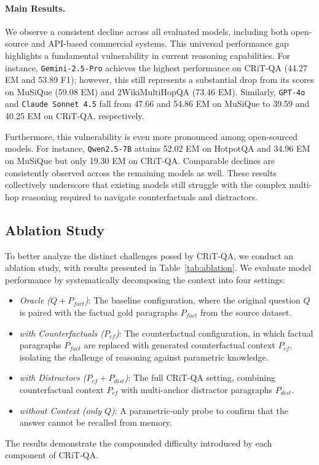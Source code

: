\documentclass[10pt, a4paper]{article}
\begin{document}
\paragraph{Main Results.} We observe a consistent decline across all evaluated models, including both open-source and API-based commercial systems. This universal performance gap highlights a fundamental vulnerability in current reasoning capabilities. For instance, \texttt{Gemini-2.5-Pro} achieves the highest performance on CRiT-QA (44.27 EM and 53.89 F1); however, this still represents a substantial drop from its scores on MuSiQue (59.08 EM) and 2WikiMultiHopQA (73.46 EM). Similarly, \texttt{GPT-4o} and \texttt{Claude Sonnet 4.5} fall from 47.66 and 54.86 EM on MuSiQue to 39.59 and 40.25 EM on CRiT-QA, respectively. 

Furthermore, this vulnerability is even more pronounced among open-sourced models. For instance, \texttt{Qwen2.5-7B} attains 52.02 EM on HotpotQA and 34.96 EM on MuSiQue but only 19.30 EM on CRiT-QA. Comparable declines are consistently observed across the remaining models as well. These results collectively underscore that existing models still struggle with the complex multi-hop reasoning required to navigate counterfactuals and distractors.


\subsection{Ablation Study}
To better analyze the distinct challenges posed by CRiT-QA, we conduct an ablation study, with results presented in Table~\ref{tab:ablation}. We evaluate model performance by systematically decomposing the context into four settings:
\begin{itemize}
    \item \textit{Oracle ($Q + P_{fact}$)}: The baseline configuration, where the original question $Q$ is paired with the factual gold paragraphs $P_{fact}$ from the source dataset.
    \item \textit{with Counterfactuals ($P_{cf}$)}: The counterfactual configuration, in which factual paragraphs $P_{fact}$ are replaced with generated counterfactual context $P_{cf}$, isolating the challenge of reasoning against parametric knowledge.
    \item \textit{with Distractors ($P_{cf}+P_{dist}$)}: The full CRiT-QA setting, combining counterfactual context $P_{cf}$ with multi-anchor distractor paragraphs $P_{dist}$. 
    \item \textit{without Context (only $Q$)}: A parametric-only probe to confirm that the answer cannot be recalled from memory.
\end{itemize} The results demonstrate the compounded difficulty introduced by each component of CRiT-QA. 
\end{document}
